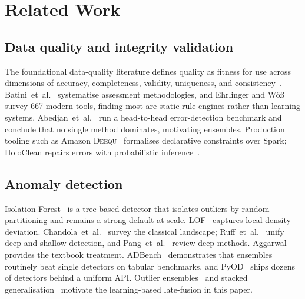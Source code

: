 \documentclass{ieeeaccess}
\begin{document}
\FloatBarrier

\section{Related Work}
\label{sec:related}

\subsection{Data quality and integrity validation}
The foundational data-quality literature defines quality as fitness for use across dimensions of accuracy,
completeness, validity, uniqueness, and consistency~\cite{wang1996beyond,pipino2002data,redman1998impact}.
Batini~et~al.~\cite{batini2009methodologies} systematise assessment methodologies, and Ehrlinger and
W{\"o}{\ss}~\cite{ehrlinger2022survey} survey 667 modern tools, finding most are static rule-engines rather
than learning systems. Abedjan~et~al.~\cite{abedjan2016detecting} run a head-to-head error-detection benchmark
and conclude that no single method dominates, motivating ensembles. Production tooling such as Amazon
\textsc{Deequ}~\cite{schelter2018automating} formalises declarative constraints over Spark; HoloClean
\cite{rekatsinas2017holoclean} repairs errors with probabilistic inference~\cite{chu2013holistic,ilyas2019data}.

\subsection{Anomaly detection}
Isolation Forest~\cite{liu2008isolation,liu2012isolation} is a tree-based detector that isolates outliers
by random partitioning and remains a strong default at scale. LOF~\cite{breunig2000lof} captures local
density deviation. Chandola~et~al.~\cite{chandola2009anomaly} survey the classical landscape;
Ruff~et~al.~\cite{ruff2021unifying} unify deep and shallow detection, and Pang~et~al.~\cite{pang2021deep}
review deep methods. Aggarwal~\cite{aggarwal2017outlier} provides the textbook treatment.
ADBench~\cite{han2022adbench} demonstrates that ensembles routinely beat single detectors on tabular
benchmarks, and PyOD~\cite{zhao2019pyod} ships dozens of detectors behind a uniform API. Outlier
ensembles~\cite{aggarwal2017outlierensembles} and stacked generalisation~\cite{wolpert1992stacked,
caruana2004ensemble} motivate the learning-based late-fusion in this paper.
\end{document}
